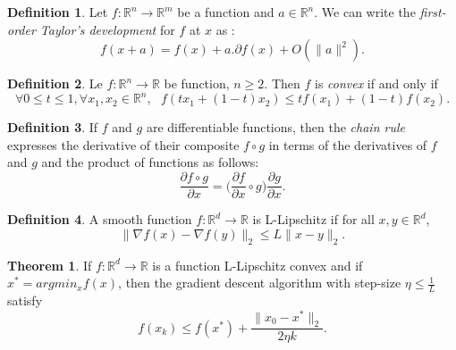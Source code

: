 \documentclass[10pt,a4paper]{article}
\theoremstyle{definition}
\newtheorem{definition}{Definition}
\theoremstyle{definition}
\newtheorem{theorem}{Theorem}
\theoremstyle{definition}
\begin{document}
\begin{definition}
Let $f: \mathbb{R}^n \rightarrow \mathbb{R}^m$ be a function and $a\in \mathbb{R}^n$.
We can write the \textit{first-order Taylor's development} for $f$ at $x$ as :
$$
f(x + a) = f(x) + a . \partial f(x) + O(\| a\|^2).
$$
\end{definition}

\begin{definition}
Le $f: \mathbb{R}^n \rightarrow \mathbb{R}$ be function, $n\geq 2$. Then $f$ is \textit{convex} if and only if
$$
\forall 0\leq t \leq 1, \forall x_1,x_2\in \mathbb{R}^n, \ \ \ f(tx_1 + (1-t)x_2) \leq tf(x_1) + (1-t)f(x_2).
$$
\end{definition}

\begin{definition}
If $f$ and $g$ are differentiable functions, then the \textit{chain rule} expresses the derivative of their composite $f \circ g$ in terms of the derivatives of $f$ and $g$ and the product of functions as follows:
$$
\frac{\partial f \circ g}{\partial x} = \Big(\frac{\partial f}{\partial x} \circ g\Big)\frac{\partial g}{\partial x}.
$$
\end{definition}

\begin{definition}
A smooth function $f:\mathbb{R}^d \to \mathbb{R}$ is L-Lipschitz if for all $x,y \in \mathbb{R}^d$,
$$
\| \nabla f(x) - \nabla f(y) \|_2 \leqslant L \|x-y\|_2.
$$
\end{definition}

\begin{theorem} \label{thmconvgd}
If $f : \mathbb{R}^d \to \mathbb{R}$ is a function L-Lipschitz convex and if $x^* = argmin_x f(x)$, then the gradient descent algorithm with step-size $\eta \leqslant \frac{1}{L}$ satisfy
$$
f(x_{k}) \leqslant f(x^*) + \frac{\|x_0 - x^* \|_2}{2\eta k} .
$$
\end{theorem}

\newpage

\nocite{*}


\end{document}
